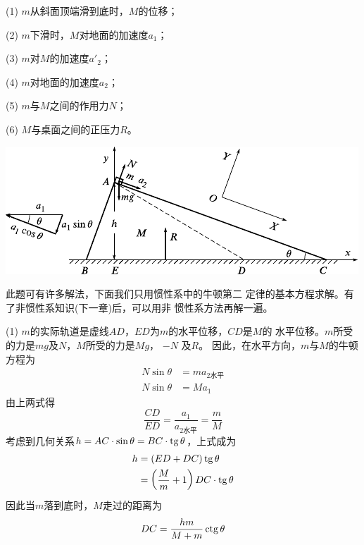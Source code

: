 (1) $ m $从斜面顶端滑到底时，$ M $的位移；

(2) $ m $下滑时，$ M $对地面的加速度$ a_1 $；

(3) $ m $对$ M $的加速度$ a'_2 $；

(4) $ m $对地面的加速度$ a_2$；

(5) $ m $与$ M  $之间的作用力$  N $；

(6) $ M $与桌面之间的正压力$ R $。
\begin{figurex}
  \centering
  \includegraphics{figure/fig03.16}
  \caption{}
  \label{fig:03.16}
\end{figurex}

\solution 此题可有许多解法，下面我们只用惯性系中的牛顿第二
定律的基本方程求解。有了非惯性系知识(下一章)后，可以用非
惯性系方法再解一遍。

(1) $ m $的实际轨道是虚线$ AD $，$ ED $为$ m $的水平位移，$ CD $是$ M $的
水平位移。$ m $所受的力是$ mg $及$ N $，$ M $所受的力是$  M g  $， $ - N $ 及$ R $。
因此，在水平方向，$ m $与$ M $的牛顿方程为
\begin{align*}
  N \sin \theta & = m a _ { 2\text{水平} } \\
  N \sin \theta & = M a _ { 1 }
\end{align*}
由上两式得
\begin{equation*}
  \frac { C D } { E D } = \frac { a _ { 1 } } { a _ { 2\text{水平}}} = \frac { m } { M }
\end{equation*}
考虑到几何关系$  h = AC \cdot \sin \theta = BC \cdot \operatorname{tg} \theta  $，上式成为
\begin{align*}
  h & = \left( E D + D C \right) \operatorname{tg} \theta                       \\
    & = \left( \frac { M } { m } + 1 \right) D C \cdot \operatorname{tg} \theta
\end{align*}
因此当$ m $落到底时，$ M $走过的距离为
\begin{equation*}
  D C = \frac { h m } { M + m } \operatorname{ctg} \theta
\end{equation*}

